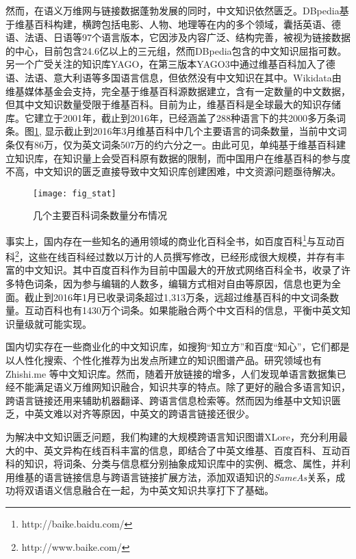 然而，在语义万维网与链接数据蓬勃发展的同时，中文知识依然匮乏。DBpedia基于维基百科构建，横跨包括电影、人物、地理等在内的多个领域，囊括英语、德语、法语、日语等97个语言版本，它因涉及内容广泛、结构完善，被视为链接数据的中心，目前包含24.6亿以上的三元组，然而DBpedia包含的中文知识屈指可数。另一个广受关注的知识库YAGO，在第三版本YAGO3中通过维基百科加入了德语、法语、意大利语等多国语言信息，但依然没有中文知识在其中。Wikidata由维基媒体基金会支持，完全基于维基百科源数据建立，含有一定数量的中文数据，但其中文知识数量受限于维基百科。目前为止，维基百科是全球最大的知识存储库。它建立于2001年，截止到2016年，已经涵盖了288种语言下的共2000多万条词条。图\ref{fig:wiki-stat}, 显示截止到2016年3月维基百科中几个主要语言的词条数量，当前中文词条仅有86万，仅为英文词条507万的约六分之一。由此可见，单纯基于维基百科建立知识库，在知识量上会受百科原有数据的限制，而中国用户在维基百科的参与度不高，中文知识的匮乏直接导致中文知识库创建困难，中文资源问题亟待解决。

\begin{figure}[H] %
  \centering
  \texttt{[image: fig\_stat]}
  \caption{几个主要百科词条数量分布情况}
  \label{fig:wiki-stat}
\end{figure}

事实上，国内存在一些知名的通用领域的商业化百科全书，如百度百科\footnote{http://baike.baidu.com/}与互动百科\footnote{http://www.baike.com/}，这些在线百科经过数以万计的人员撰写修改，已经形成很大规模，并存有丰富的中文知识。其中百度百科作为目前中国最大的开放式网络百科全书，收录了许多特色词条，因为参与编辑的人数多，编辑方式相对自由等原因，信息也更为全面。截止到2016年1月已收录词条超过1,313万条，远超过维基百科的中文词条数量。互动百科也有1430万个词条。如果能融合两个中文百科的信息，平衡中英文知识量级就可能实现。

国内切实存在一些商业化的中文知识库，如搜狗“知立方”和百度“知心”，它们都是以人性化搜索、个性化推荐为出发点所建立的知识图谱产品。研究领域也有Zhishi.me\cite{niu2011zhishi} 等中文知识库。然而，随着开放链接的增多，人们发现单语言数据集已经不能满足语义万维网知识融合，知识共享的特点。除了更好的融合多语言知识，跨语言链接还用来辅助机器翻译\cite{niehues2011using}、跨语言信息检索\cite{giang2015building}等。然而因为维基中文知识匮乏，中英文难以对齐等原因，中英文的跨语言链接还很少。

为解决中文知识匮乏问题，我们构建的大规模跨语言知识图谱XLore，充分利用最大的中、英文异构在线百科丰富的信息，即结合了中英文维基、百度百科、互动百科的知识，将词条、分类与信息框分别抽象成知识库中的实例、概念、属性，并利用维基的语言链接信息与跨语言链接扩展方法\cite{wang2012cross}，添加双语知识的\textit{SameAs}关系，成功将双语语义信息融合在一起，为中英文知识共享打下了基础。

